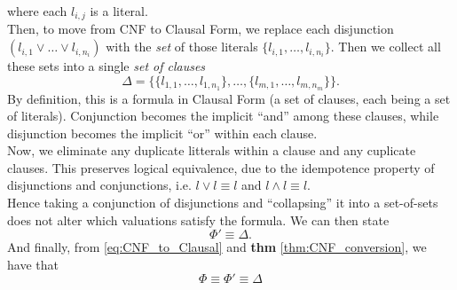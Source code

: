 where each \(l_{i,j}\) is a literal.
\\
Then, to move from CNF to Clausal Form, we replace each disjunction \( (l_{i,1} \vee \ldots \vee l_{i,n_i}) \) with the \emph{set} of those literals \(\{l_{i,1}, \ldots, l_{i,n_i}\}\). Then we collect all these sets into a single \emph{set of clauses}
\begin{equation*}
    \Delta = \bigg\{
        \{l_{1,1}, \ldots, l_{1,n_1}\}, \ldots, \{l_{m,1}, \ldots, l_{m,n_m}\}
    \bigg\}.
\end{equation*}
By definition, this is a formula in Clausal Form (a set of clauses, each being a set of literals). Conjunction becomes the implicit “and” among these clauses, while disjunction becomes the implicit “or” within each clause.
\\
Now, we eliminate any duplicate litterals within a clause and any cuplicate clauses. This preserves logical equivalence, due to the idempotence property of disjunctions and conjunctions, i.e. \(l \vee l \equiv l\) and \(l \wedge l \equiv l\).
\\
Hence taking a conjunction of disjunctions and “collapsing” it into a set-of-sets does not alter which valuations satisfy the formula. We can then state
\begin{equation}\label{eq:CNF_to_Clausal}
    \Phi' \equiv \Delta.
\end{equation}
And finally, from \autoref{eq:CNF_to_Clausal} and \textbf{thm} \ref{thm:CNF_conversion}, we have that
\begin{equation*}
    \Phi \equiv \Phi' \equiv \Delta \tag*{\(\blacksquare\).}
\end{equation*}

